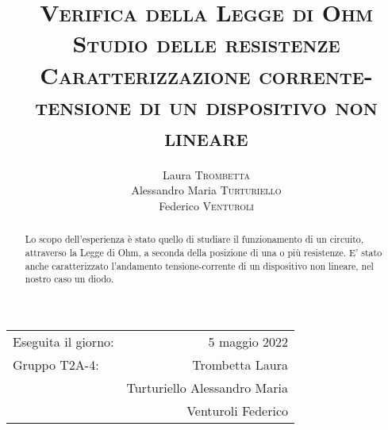 \documentclass[a4paper,12pt, italian]{article}
\title{\textsc{Verifica della Legge di Ohm\\
Studio delle resistenze\\
Caratterizzazione corrente-tensione di un dispositivo non lineare}}
\date{}
\author{Laura \textsc{Trombetta}\\ Alessandro Maria \textsc{Turturiello}\\Federico \textsc{Venturoli}}
\begin{document}
\maketitle 

\begin{center}
\begin{tabular}{l r}
Eseguita il giorno: &  5 maggio 2022 \\ 
Gruppo T2A-4: & Trombetta Laura\\
& Turturiello Alessandro Maria \\
& Venturoli Federico \\ 

\end{tabular}
\end{center}
\begin{abstract}
Lo scopo dell'esperienza è stato quello di studiare il funzionamento di un circuito, attraverso la Legge di Ohm, a seconda della posizione di una o più resistenze. E' stato anche caratterizzato l'andamento tensione-corrente di un dispositivo non lineare, nel nostro caso un diodo.
\end{abstract}
\tableofcontents
\maketitle
\newpage






\end{document}
